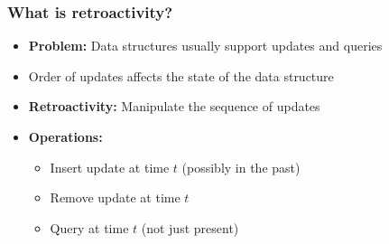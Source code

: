 \documentclass[fleqn]{beamer}
\begin{document}
\begin{frame}
    \frametitle{What is retroactivity?}
    
    \begin{itemize}
    \item \textbf{Problem:} Data structures usually support updates and queries \vfill
    \item Order of updates affects the state of the data structure \vfill\pause
    \item \textbf{Retroactivity:} Manipulate the sequence of updates \vfill\pause
    \item \textbf{Operations:}
        \begin{itemize}
        \item Insert update at time $t$ (possibly in the past)
        \item Remove update at time $t$
        \item Query at time $t$ (not just present)
        \end{itemize} \vfill
    \end{itemize}
\end{frame}
\end{document}
